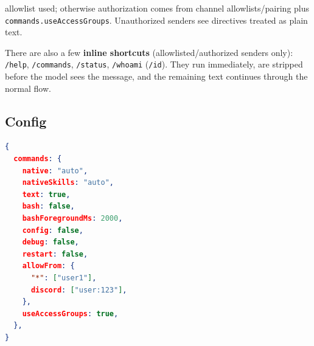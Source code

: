 allowlist used; otherwise authorization comes from channel allowlists/pairing plus \texttt{commands.useAccessGroups}.
Unauthorized senders see directives treated as plain text.

There are also a few \textbf{inline shortcuts} (allowlisted/authorized senders only): \texttt{/help}, \texttt{/commands}, \texttt{/status}, \texttt{/whoami} (\texttt{/id}).
They run immediately, are stripped before the model sees the message, and the remaining text continues through the normal flow.

\subsection{Config}


\begin{lstlisting}[language=json]
{
  commands: {
    native: "auto",
    nativeSkills: "auto",
    text: true,
    bash: false,
    bashForegroundMs: 2000,
    config: false,
    debug: false,
    restart: false,
    allowFrom: {
      "*": ["user1"],
      discord: ["user:123"],
    },
    useAccessGroups: true,
  },
}
\end{lstlisting}


